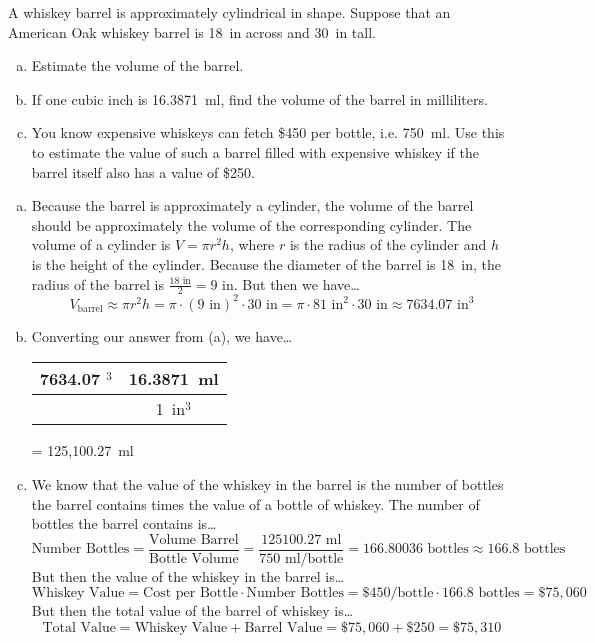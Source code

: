 \documentclass[11pt,letterpaper]{article}
\begin{document}
\newpage



 A whiskey barrel is approximately cylindrical in shape. Suppose that an American Oak whiskey barrel is 18~in across and 30~in tall.
	\begin{enumerate}[(a)]
	\item Estimate the volume of the barrel. 
	\item If one cubic inch is 16.3871~ml, find the volume of the barrel in milliliters. 
	\item You know expensive whiskeys can fetch \$450 per bottle, i.e. 750~ml. Use this to estimate the value of such a barrel filled with expensive whiskey if the barrel itself also has a value of \$250.
	\end{enumerate} \pspace

\sol 
\begin{enumerate}[(a)]
\item Because the barrel is approximately a cylinder, the volume of the barrel should be approximately the volume of the corresponding cylinder. The volume of a cylinder is $V= \pi r^2 h$, where $r$ is the radius of the cylinder and $h$ is the height of the cylinder. Because the diameter of the barrel is 18~in, the radius of the barrel is $\frac{18 \text{ in}}{2}= 9 \text{ in}$. But then we have\dots
	\[
	V_{\text{barrel}} \approx \pi r^2 h= \pi \cdot (9 \text{ in})^2 \cdot 30 \text{ in}= \pi \cdot 81 \text{ in}^2 \cdot 30 \text{ in} \approx 7634.07 \text{ in}^3
	\] \pspace

\item Converting our answer from (a), we have\dots \par
	\begin{table}[H]
	\centering
	\begin{tabular}{c||c}
	7634.07 \text{ in}$^3$ & 16.3871~ml \\ \hline
				       & 1~in$^3$ 
	\end{tabular} = 125,100.27~ml
	\end{table} \pspace

\item We know that the value of the whiskey in the barrel is the number of bottles the barrel contains times the value of a bottle of whiskey. The number of bottles the barrel contains is\dots
	\[
	\text{Number Bottles}= \frac{\text{Volume Barrel}}{\text{Bottle Volume}}= \frac{125100.27 \text{ ml}}{750 \text{ ml/bottle}} = 166.80036 \text{ bottles} \approx 166.8 \text{ bottles}
	\] \pspace
But then the value of the whiskey in the barrel is\dots 
	\[
	\text{Whiskey Value}= \text{Cost per Bottle} \cdot \text{Number Bottles}= \$450 \text{/bottle} \cdot 166.8 \text{ bottles}= \$75,060
	\] 
But then the total value of the barrel of whiskey is\dots
	\[
	\text{Total Value}= \text{Whiskey Value} + \text{Barrel Value}= \$75,060 + \$250= \$75,310
	\]
\end{enumerate} \vfill
\end{document}
